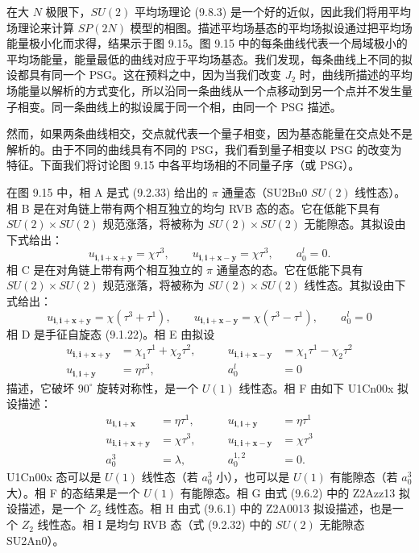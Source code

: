 在大 $N$ 极限下，$SU(2)$ 平均场理论 (9.8.3) 是一个好的近似，因此我们将用平均场理论来计算 $SP(2N)$ 模型的相图。描述平均场基态的平均场拟设通过把平均场能量极小化而求得，结果示于图 9.15。图 9.15 中的每条曲线代表一个局域极小的平均场能量，能量最低的曲线对应于平均场基态。我们发现，每条曲线上不同的拟设都具有同一个 PSG。这在预料之中，因为当我们改变 $J_2$ 时，曲线所描述的平均场能量以解析的方式变化，所以沿同一条曲线从一个点移动到另一个点并不发生量子相变。同一条曲线上的拟设属于同一个相，由同一个 PSG 描述。

然而，如果两条曲线相交，交点就代表一个量子相变，因为基态能量在交点处不是解析的。由于不同的曲线具有不同的 PSG，我们看到量子相变以 PSG 的改变为特征。下面我们将讨论图 9.15 中各平均场相的不同量子序（或 PSG）。

在图 9.15 中，相 A 是式 (9.2.33) 给出的 $\pi$ 通量态（SU2Bn0 $SU(2)$ 线性态）。相 B 是在对角链上带有两个相互独立的均匀 RVB 态的态。它在低能下具有 $SU(2)\times SU(2)$ 规范涨落，将被称为 $SU(2)\times SU(2)$ 无能隙态。其拟设由下式给出：
\begin{equation*}
u_{\pmb{i},\pmb{i}+\pmb{x}+\pmb{y}}=\chi\tau^{3},\qquad
u_{\pmb{i},\pmb{i}+\pmb{x}-\pmb{y}}=\chi\tau^{3},\qquad
a_0^{l}=0.
\tag{9.8.6}
\end{equation*}
相 C 是在对角链上带有两个相互独立的 $\pi$ 通量态的态。它在低能下具有 $SU(2)\times SU(2)$ 规范涨落，将被称为 $SU(2)\times SU(2)$ 线性态。其拟设由下式给出：
\begin{equation*}
u_{\pmb{i},\pmb{i}+\pmb{x}+\pmb{y}}=\chi(\tau^{3}+\tau^{1}),\qquad
u_{\pmb{i},\pmb{i}+\pmb{x}-\pmb{y}}=\chi(\tau^{3}-\tau^{1}),\qquad
a_0^{l}=0
\tag{9.8.7}
\end{equation*}
相 D 是手征自旋态 (9.1.22)。相 E 由拟设
\begin{equation*}
\begin{aligned}
u_{\pmb{i},\pmb{i}+\pmb{x}+\pmb{y}}&=\chi_1\tau^{1}+\chi_2\tau^{2}, &\qquad
u_{\pmb{i},\pmb{i}+\pmb{x}-\pmb{y}}&=\chi_1\tau^{1}-\chi_2\tau^{2}\\
u_{\pmb{i},\pmb{i}+\pmb{y}}&=\eta\tau^{3}, &\qquad
a_0^{l}&=0
\end{aligned}
\tag{9.8.8}
\end{equation*}
描述，它破坏 $90^{\circ}$ 旋转对称性，是一个 $U(1)$ 线性态。相 F 由如下 U1Cn00x 拟设描述：
\begin{equation*}
\begin{aligned}
u_{\pmb{i},\pmb{i}+\pmb{x}}&=\eta\tau^{1}, &\qquad
u_{\pmb{i},\pmb{i}+\pmb{y}}&=\eta\tau^{1}\\
u_{\pmb{i},\pmb{i}+\pmb{x}+\pmb{y}}&=\chi\tau^{3}, &\qquad
u_{\pmb{i},\pmb{i}+\pmb{x}-\pmb{y}}&=\chi\tau^{3}\\
a_0^{3}&=\lambda, &\qquad
a_0^{1,2}&=0.
\end{aligned}
\tag{9.8.9}
\end{equation*}
U1Cn00x 态可以是 $U(1)$ 线性态（若 $a_0^{3}$ 小），也可以是 $U(1)$ 有能隙态（若 $a_0^{3}$ 大）。相 F 的态结果是一个 $U(1)$ 有能隙态。相 G 由式 (9.6.2) 中的 Z2Azz13 拟设描述，是一个 $Z_2$ 线性态。相 H 由式 (9.6.1) 中的 Z2A0013 拟设描述，也是一个 $Z_2$ 线性态。相 I 是均匀 RVB 态（式 (9.2.32) 中的 $SU(2)$ 无能隙态 SU2An0）。

